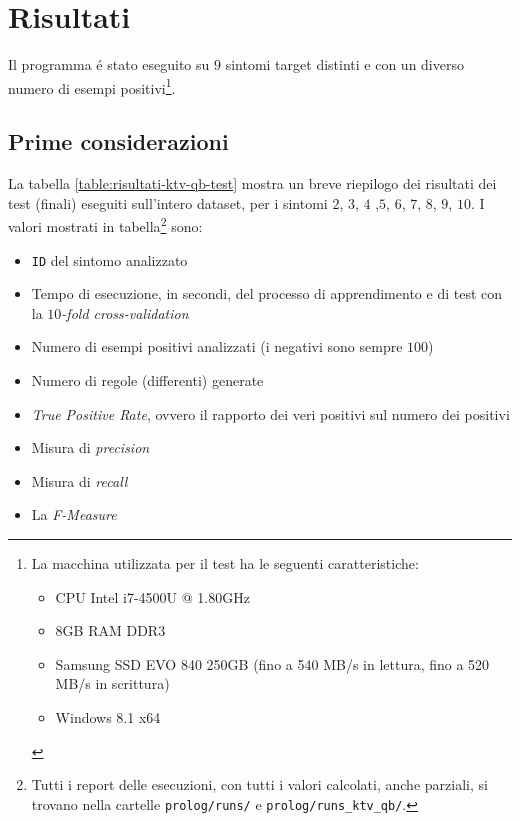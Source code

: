 \documentclass[preprint]{acm_proc_article-sp}
\begin{document}
\section{Risultati}
Il programma \'e stato eseguito su $9$ sintomi target distinti e con un diverso numero di esempi positivi\footnote{La macchina utilizzata per il test ha le seguenti caratteristiche:
\begin{itemize}
\item CPU Intel i7-4500U @ 1.80GHz
\item 8GB RAM DDR3
\item Samsung SSD EVO 840 250GB (fino a 540 MB/s in lettura, fino a 520 MB/s in scrittura)
\item Windows 8.1 x64
\end{itemize}}.

\subsection{Prime considerazioni}
\label{risultati-prime-considerazioni}
La tabella \ref{table:risultati-ktv-qb-test} mostra un breve riepilogo dei risultati dei test (finali) eseguiti sull'intero dataset, per i sintomi $2$, $3$, $4$ ,$5$, $6$, $7$, $8$, $9$, $10$. I valori mostrati in tabella\footnote{Tutti i report delle esecuzioni, con tutti i valori calcolati, anche parziali, si trovano nella cartelle \verb|prolog/runs/| e \verb|prolog/runs_ktv_qb/|.} sono:
\begin{itemize}
\item \verb|ID| del sintomo analizzato
\item Tempo di esecuzione, in secondi, del processo di apprendimento e di test con la $10$\textit{-fold cross-validation}
\item Numero di esempi positivi analizzati (i negativi sono sempre $100$)
\item Numero di regole (differenti) generate
\item \textit{True Positive Rate}, ovvero il rapporto dei veri positivi sul numero dei positivi
\item Misura di \textit{precision}
\item Misura di \textit{recall}
\item La \textit{F-Measure}
\end{itemize}
\end{document}
